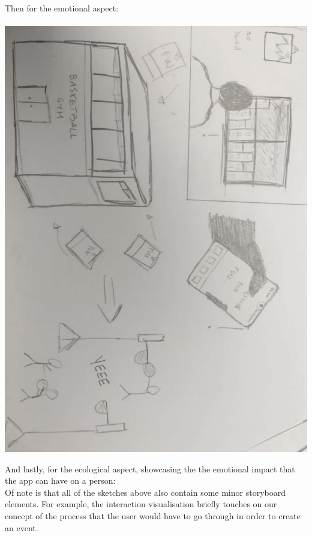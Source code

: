 \documentclass[12pt]{report}
\begin{document}
	Then for the emotional aspect:\\\\
	\includegraphics[scale=0.41]{Emotional.jpg}\break
	\newpage
	
	And lastly, for the ecological aspect, showcasing the the emotional impact that the app can have on a person:
	\\
	Of note is that all of the sketches above also contain some minor storyboard elements. For example, the interaction visualisation briefly touches on our concept of the process that the user would have to go through in order to create an event.
	\newpage
\end{document}
